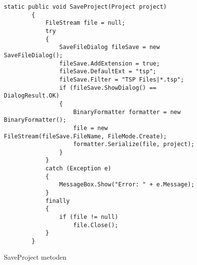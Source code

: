 \begin{figure}[H]
\begin{lstlisting}
static public void SaveProject(Project project)
        { 
            FileStream file = null;
            try
            {
                SaveFileDialog fileSave = new SaveFileDialog();
                fileSave.AddExtension = true;
                fileSave.DefaultExt = "tsp";
                fileSave.Filter = "TSP Files|*.tsp";
                if (fileSave.ShowDialog() == DialogResult.OK)
                {
                    BinaryFormatter formatter = new BinaryFormatter();
                    file = new FileStream(fileSave.FileName, FileMode.Create);
                    formatter.Serialize(file, project);
                }
            }
            catch (Exception e)
            {
                MessageBox.Show("Error: " + e.Message);
            }
            finally
            {
                if (file != null)
                    file.Close();
            }
        }
\end{lstlisting}
\caption{SaveProject metoden}
\end{figure}